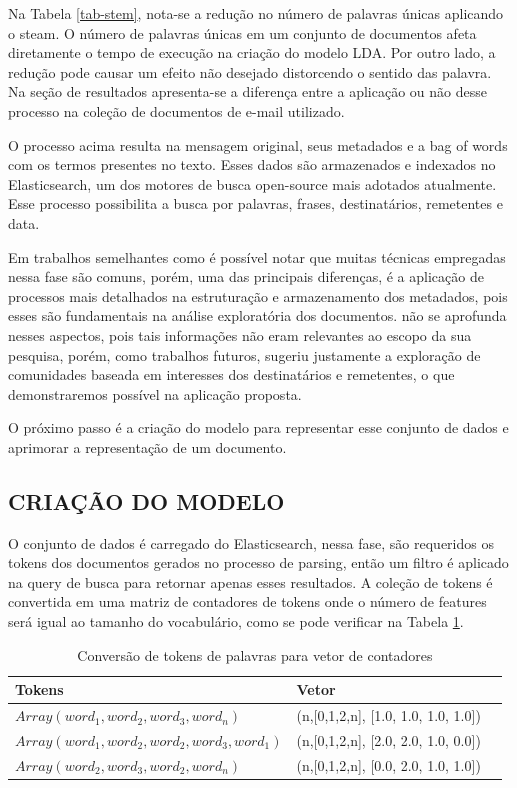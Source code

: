 \documentclass[12pt,a4paper]{article}
\begin{document}
\begin{enumerate}
Na Tabela \ref{tab-stem}, nota-se a redução no número de palavras únicas aplicando o steam. O número de palavras únicas em um conjunto de documentos afeta diretamente o tempo de execução na criação do modelo LDA.
 Por outro lado, a redução pode causar um efeito não desejado distorcendo o sentido das palavra. Na seção de resultados apresenta-se a diferença entre a aplicação ou não desse processo na coleção de documentos de e-mail utilizado.
\end{enumerate}


O processo acima resulta na mensagem original, seus metadados e a bag of words com os termos presentes no texto. Esses dados são armazenados e indexados no Elasticsearch,
 um dos motores de busca open-source mais adotados atualmente. Esse processo possibilita a busca por palavras, frases, destinatários, remetentes e data. 

Em trabalhos semelhantes como  é possível notar que muitas técnicas empregadas nessa fase são comuns, porém, uma das principais diferenças,
 é a aplicação de processos mais detalhados na estruturação e armazenamento dos metadados, pois esses são fundamentais na análise exploratória dos documentos.
  não se aprofunda nesses aspectos, pois tais informações não eram relevantes ao escopo da sua pesquisa,
 porém, como trabalhos futuros, sugeriu justamente a exploração de comunidades baseada em interesses dos destinatários e remetentes, o que demonstraremos possível na aplicação proposta.

O próximo passo é a criação do modelo para representar esse conjunto de dados e aprimorar a representação de um documento.



\subsection{CRIAÇÃO DO MODELO}
O conjunto de dados é carregado do Elasticsearch, nessa fase, são requeridos os tokens dos documentos gerados no processo de parsing, então
 um filtro é aplicado na query de busca para retornar apenas esses resultados. A coleção de tokens é convertida em uma matriz de contadores de tokens onde o número de features será igual ao tamanho do vocabulário, como se pode verificar na Tabela \ref{tab-voc}.


\begin{table}[h]
  \centering
  \begin{tabular}{l l l}
  Tokens		&Vetor &\\
  \hline
  $Array(word_1, word_2, word_3, word_n)$						&(n,[0,1,2,n], [1.0, 1.0, 1.0, 1.0]) &\\
  $Array(word_1, word_2, word_2, word_3, word_1)$				&(n,[0,1,2,n], [2.0, 2.0, 1.0, 0.0]) &\\
  $Array(word_2, word_3, word_2, word_n)$						&(n,[0,1,2,n], [0.0, 2.0, 1.0, 1.0]) &\\
  \hline
  \end{tabular}
  
  \caption{Conversão de tokens de palavras para vetor de contadores}
  \label{tab-voc}
\end{table}
\end{document}
